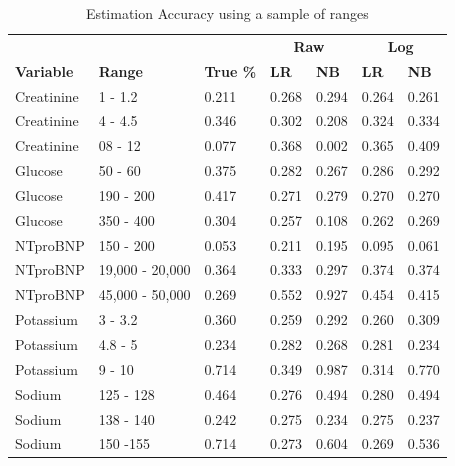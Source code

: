 \documentclass[a4paper,UKenglish]{oasics-v2016}
\begin{document}
\begin{table}[h]
\centering
\caption{Estimation Accuracy using a sample of ranges}
\label{table:riskestimates}
\begin{tabular}{lll|ll|ll}
\hline
\textbf{}         & \textbf{}       & \textbf{}   & \multicolumn{2}{c|}{\textbf{Raw}} & \multicolumn{2}{c}{\textbf{Log}} \\
\textbf{Variable} & \textbf{Range}  & \textbf{True \%} & \textbf{LR}     & \textbf{NB}    & \textbf{LR}     & \textbf{NB}    \\
\hline
Creatinine & 1 - 1.2         & 0.211 & 0.268      & 0.294      & 0.264      & 0.261      \\
Creatinine & 4 - 4.5         & 0.346 & 0.302      & 0.208      & 0.324      & 0.334      \\
Creatinine & 08 - 12         & 0.077 & 0.368      & 0.002      & 0.365      & 0.409      \\
Glucose    & 50 - 60         & 0.375 & 0.282      & 0.267      & 0.286      & 0.292      \\
Glucose    & 190 - 200       & 0.417 & 0.271      & 0.279      & 0.270      & 0.270      \\
Glucose    & 350 - 400       & 0.304 & 0.257      & 0.108      & 0.262      & 0.269      \\
NTproBNP   & 150 - 200       & 0.053 & 0.211      & 0.195      & 0.095      & 0.061      \\
NTproBNP   & 19,000 - 20,000 & 0.364 & 0.333      & 0.297      & 0.374      & 0.374      \\
NTproBNP   & 45,000 - 50,000 & 0.269 & 0.552      & 0.927      & 0.454      & 0.415      \\
Potassium  & 3 - 3.2         & 0.360 & 0.259      & 0.292      & 0.260      & 0.309      \\
Potassium  & 4.8 - 5         & 0.234 & 0.282      & 0.268      & 0.281      & 0.234      \\
Potassium  & 9 - 10          & 0.714 & 0.349      & 0.987      & 0.314      & 0.770      \\
Sodium     & 125 - 128       & 0.464 & 0.276      & 0.494      & 0.280      & 0.494      \\
Sodium     & 138 - 140       & 0.242 & 0.275      & 0.234      & 0.275      & 0.237      \\
Sodium     & 150 -155        & 0.714 & 0.273      & 0.604      & 0.269      & 0.536      \\
\hline
\end{tabular}
\end{table}
\end{document}
